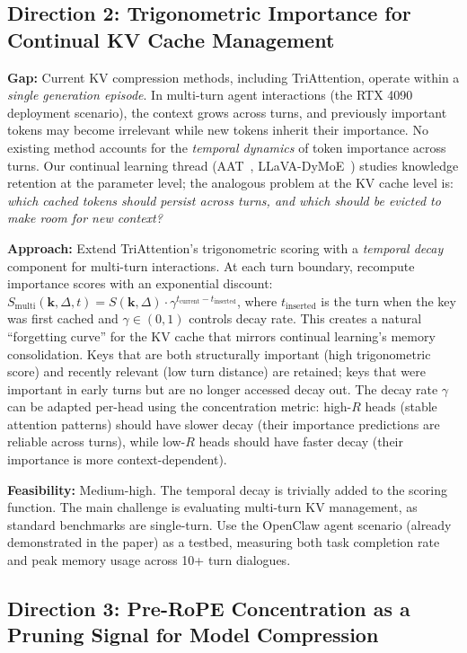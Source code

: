 \documentclass[11pt]{article}
\begin{document}
\subsection{Direction 2: Trigonometric Importance for Continual KV Cache Management}

\textbf{Gap:} Current KV compression methods, including TriAttention, operate within a \textit{single generation episode}. In multi-turn agent interactions (the RTX 4090 deployment scenario), the context grows across turns, and previously important tokens may become irrelevant while new tokens inherit their importance. No existing method accounts for the \textit{temporal dynamics} of token importance across turns. Our continual learning thread (AAT~\cite{aat}, LLaVA-DyMoE~\cite{dymoe}) studies knowledge retention at the parameter level; the analogous problem at the KV cache level is: \textit{which cached tokens should persist across turns, and which should be evicted to make room for new context?}

\textbf{Approach:} Extend TriAttention's trigonometric scoring with a \textit{temporal decay} component for multi-turn interactions. At each turn boundary, recompute importance scores with an exponential discount: $S_{\mathrm{multi}}(\mathbf{k}, \Delta, t) = S(\mathbf{k}, \Delta) \cdot \gamma^{t_{\mathrm{current}} - t_{\mathrm{inserted}}}$, where $t_{\mathrm{inserted}}$ is the turn when the key was first cached and $\gamma \in (0,1)$ controls decay rate. This creates a natural ``forgetting curve'' for the KV cache that mirrors continual learning's memory consolidation. Keys that are both structurally important (high trigonometric score) and recently relevant (low turn distance) are retained; keys that were important in early turns but are no longer accessed decay out. The decay rate $\gamma$ can be adapted per-head using the concentration metric: high-$R$ heads (stable attention patterns) should have slower decay (their importance predictions are reliable across turns), while low-$R$ heads should have faster decay (their importance is more context-dependent).

\textbf{Feasibility:} Medium-high. The temporal decay is trivially added to the scoring function. The main challenge is evaluating multi-turn KV management, as standard benchmarks are single-turn. Use the OpenClaw agent scenario (already demonstrated in the paper) as a testbed, measuring both task completion rate and peak memory usage across 10+ turn dialogues.

\subsection{Direction 3: Pre-RoPE Concentration as a Pruning Signal for Model Compression}
\end{document}
